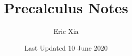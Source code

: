 \documentclass{article}
\title{Precalculus Notes}
\author{Eric Xia}
\date{Last Updated 10 June 2020}
\begin{document}
    \maketitle
    \tableofcontents
    \pagebreak

\end{document}
